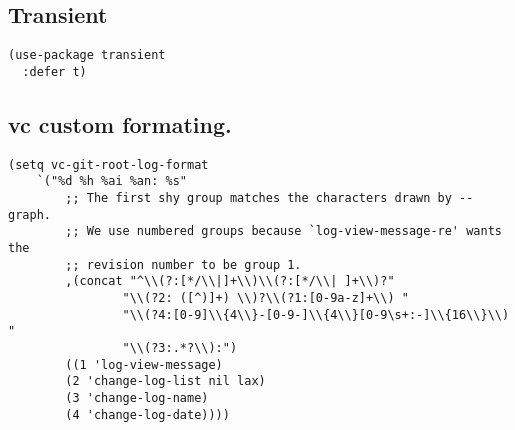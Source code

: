 \documentclass[11pt]{article}
\begin{document}
\subsection{Transient}
\label{sec:orgf815bd0}
\begin{verbatim}
(use-package transient
  :defer t)
\end{verbatim}
\subsection{vc custom formating.}
\label{sec:org86b1e9e}
\begin{verbatim}
(setq vc-git-root-log-format
    `("%d %h %ai %an: %s"
        ;; The first shy group matches the characters drawn by --graph.
        ;; We use numbered groups because `log-view-message-re' wants the
        ;; revision number to be group 1.
        ,(concat "^\\(?:[*/\\|]+\\)\\(?:[*/\\| ]+\\)?"
                "\\(?2: ([^)]+) \\)?\\(?1:[0-9a-z]+\\) "
                "\\(?4:[0-9]\\{4\\}-[0-9-]\\{4\\}[0-9\s+:-]\\{16\\}\\) "
                "\\(?3:.*?\\):")
        ((1 'log-view-message)
        (2 'change-log-list nil lax)
        (3 'change-log-name)
        (4 'change-log-date))))
\end{verbatim}
\end{document}
